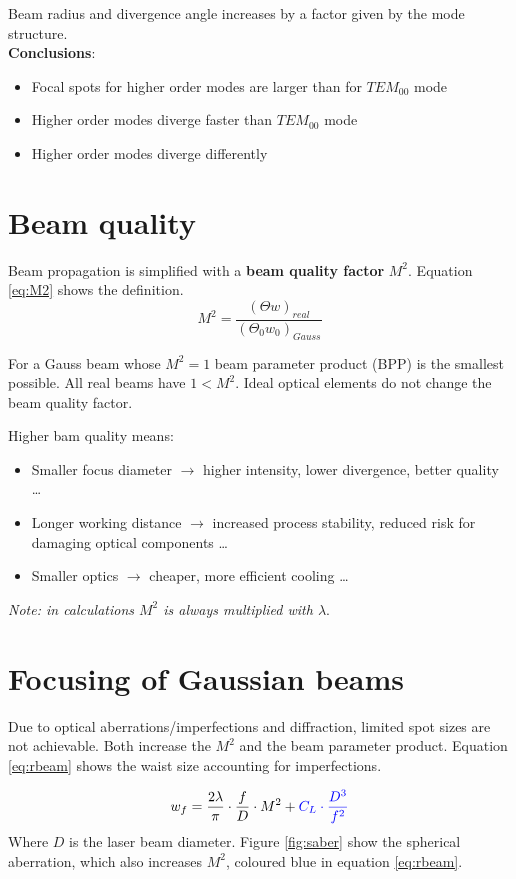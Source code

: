 Beam radius and divergence angle increases by a factor given by the mode structure.\\
\textbf{Conclusions}:
\begin{itemize}
    \item Focal spots for higher order modes are larger than for $TEM_{00}$ mode
    \item Higher order modes diverge faster than $TEM_{00}$ mode
    \item Higher order modes diverge differently
\end{itemize}

\section{Beam quality}
Beam propagation is simplified with a \textbf{beam quality factor} $M^2$.
Equation \ref{eq:M2} shows the definition.
\begin{equation}
    M^2 = \frac{(\Theta w)_{real}}{(\Theta_0 w_0)_{Gauss}}
    \label{eq:M2}
\end{equation}

For a Gauss beam whose  $M^2 = 1$ beam parameter product (BPP) is the smallest possible. 
All real beams have $1 < M^2 $. Ideal optical elements do not change the beam quality factor. 

Higher bam quality means:
\begin{itemize}
    \item Smaller focus diameter $\rightarrow$ higher intensity, lower divergence, better quality \dots
    \item Longer working distance $\rightarrow$ increased process stability, reduced risk for damaging optical components \dots
    \item Smaller optics $\rightarrow$ cheaper, more efficient cooling \dots
\end{itemize}

\textit{Note: in calculations $M^2$ is always multiplied with $\lambda$}.

\section{Focusing of Gaussian beams}

Due to optical aberrations/imperfections and diffraction, limited spot sizes are 
not achievable. Both increase the $M^2$ and the beam parameter product.
Equation \ref{eq:rbeam} shows the waist size accounting for imperfections.

\begin{equation}
    w_f = \textcolor{black}{\frac{2\lambda}{\pi} \cdot \frac{f}{D} \cdot M^2} + \textcolor{blue}{ C_L \cdot \frac{D^3}{f^2} }
    \label{eq:rbeam}
\end{equation}
Where $D$ is the laser beam diameter.  Figure \ref{fig:saber} show the spherical aberration, which also increases $M^2$, coloured blue in equation \ref{eq:rbeam}.


